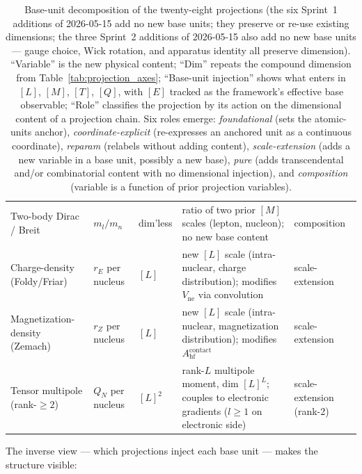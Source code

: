 \documentclass[11pt]{article}
\begin{document}
\begin{table}[h]
\begin{tabular}{p{3cm} p{2.2cm} p{0.9cm} p{4.5cm} p{1.6cm}}
Two-body Dirac / Breit & $m_l / m_n$ & dim'less &
ratio of two prior $[M]$ scales (lepton, nucleon); no new base
content & composition \\
Charge-density (Foldy/Friar) & $r_E$ per nucleus & $[L]$ &
new $[L]$ scale (intra-nuclear, charge distribution); modifies
$V_\text{ne}$ via convolution & scale-extension \\
Magnetization-density (Zemach) & $r_Z$ per nucleus & $[L]$ &
new $[L]$ scale (intra-nuclear, magnetization distribution);
modifies $A_\text{hf}^\text{contact}$ & scale-extension \\
Tensor multipole (rank-$\geq 2$) & $Q_N$ per nucleus & $[L]^2$ &
rank-$L$ multipole moment, dim $[L]^L$; couples to electronic
gradients ($l \geq 1$ on electronic side) &
scale-extension (rank-2) \\
\bottomrule
\end{tabular}
\caption{Base-unit decomposition of the twenty-eight projections (the
six Sprint~1 additions of 2026-05-15 add no new base units; they
preserve or re-use existing dimensions; the three Sprint~2 additions
of 2026-05-15 also add no new base units --- gauge choice, Wick
rotation, and apparatus identity all preserve dimension).
``Variable'' is the new physical content; ``Dim'' repeats the
compound dimension from Table~\ref{tab:projection_axes};
``Base-unit injection'' shows what enters in $[L]$, $[M]$, $[T]$,
$[Q]$, with $[E]$ tracked as the framework's effective base
observable; ``Role'' classifies the projection by its action on the
dimensional content of a projection chain.  Six roles emerge:
\emph{foundational} (sets the atomic-units anchor),
\emph{coordinate-explicit} (re-expresses an anchored unit as a
continuous coordinate), \emph{reparam} (relabels without adding
content), \emph{scale-extension} (adds a new variable in a base
unit, possibly a new base), \emph{pure} (adds transcendental and/or
combinatorial content with no dimensional injection), and
\emph{composition} (variable is a function of prior projection
variables).}
\label{tab:base_units}
\end{table}

The inverse view --- which projections inject each base unit ---
makes the structure visible:
\end{document}
